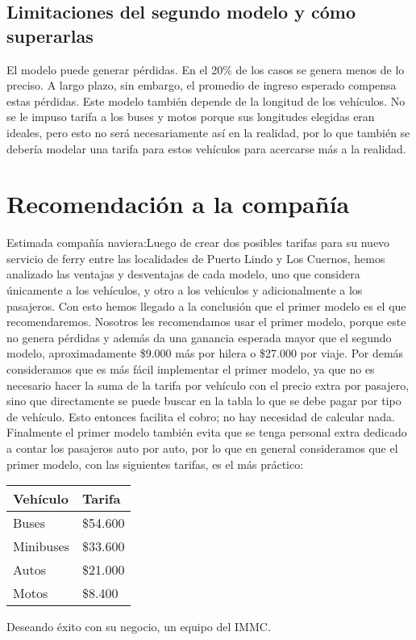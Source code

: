\documentclass[a4paper]{article}
\begin{document}
\subsection{Limitaciones del segundo modelo y cómo superarlas}
El modelo puede generar pérdidas. En el 20\% de los casos se genera menos de lo preciso. A largo plazo, sin embargo, el promedio de ingreso esperado compensa estas pérdidas. \newline\newline Este modelo también depende de la longitud de los vehículos. No se le impuso tarifa a los buses y motos porque sus longitudes elegidas eran ideales, pero esto no será necesariamente así en la realidad, por lo que también se debería modelar una tarifa para estos vehículos para acercarse más a la realidad. 

\section{Recomendación a la compañía}
Estimada compañía naviera:\newline\newline Luego de crear dos posibles tarifas para su nuevo servicio de ferry entre las localidades de Puerto Lindo y Los Cuernos, hemos analizado las ventajas y desventajas de cada modelo, uno que considera únicamente a los vehículos, y otro a los vehículos y adicionalmente a los pasajeros. Con esto hemos llegado a la conclusión que el primer modelo es el que recomendaremos. \newline\newline Nosotros les recomendamos usar el primer modelo, porque este no genera pérdidas y además da una ganancia esperada mayor que el segundo modelo, aproximadamente \$9.000 más por hilera o \$27.000 por viaje. Por demás consideramos que es más fácil implementar el primer modelo, ya que no es necesario hacer la suma de la tarifa por vehículo con el  precio extra por pasajero, sino que directamente se puede buscar en la tabla lo que se debe pagar por tipo de vehículo. Esto entonces facilita el cobro; no hay necesidad de calcular nada. Finalmente el primer modelo también evita que se tenga personal extra dedicado a contar los pasajeros auto por auto, por lo que en general consideramos que el primer modelo, con las siguientes tarifas, es el más práctico: \begin{table}[h]
    \centering
    \begin{tabular}{|M{2cm}|M{2cm}|}
        \hline
       Vehículo  &  Tarifa \\
       \hline
       Buses  & \$54.600 \\
        \hline
       Minibuses  & \$33.600 \\
       \hline
       Autos  & \$21.000 \\
       \hline
         Motos & \$8.400 \\
         \hline
    \end{tabular}
\end{table} \newline Deseando éxito con su negocio, \newline\newline un equipo del IMMC.
\end{document}
